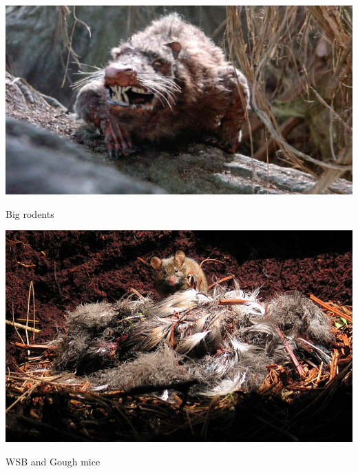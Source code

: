 \documentclass[12pt]{article}
\newcommand{\headsize}{\fontsize{35}{35} \selectfont}
\begin{document}
\vspace{10mm}

\centerline{\includegraphics[width=\textwidth]{Figs/rodents_of_unusual_size.jpg}}




\newpage

\addtocounter{page}{-1}

\headsize \color{myyellow}
\hfill \begin{minipage}{5.75in}
\centering
Big rodents
\end{minipage}

\vspace{10mm}

\centerline{\includegraphics[width=\textwidth]{Figs/gough_mouse_with_bird.jpg}}


\newpage

\headsize \color{myyellow}
\hfill \begin{minipage}{5.75in}
\centering
WSB and Gough mice
\end{minipage}

\vspace{30mm}
\end{document}
